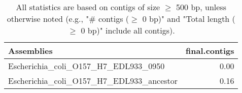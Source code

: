 \documentclass[12pt,a4paper]{article}
\begin{document}
\begin{table}[ht]
\begin{center}
\caption{All statistics are based on contigs of size $\geq$ 500 bp, unless otherwise noted (e.g., "\# contigs ($\geq$ 0 bp)" and "Total length ($\geq$ 0 bp)" include all contigs).}
\begin{tabular}{|l*{1}{|r}|}
\hline
Assemblies & final.contigs \\ \hline
Escherichia\_coli\_O157\_H7\_EDL933\_0950 & 0.00 \\ \hline
Escherichia\_coli\_O157\_H7\_EDL933\_ancestor & 0.16 \\ \hline
\end{tabular}
\end{center}
\end{table}
\end{document}
